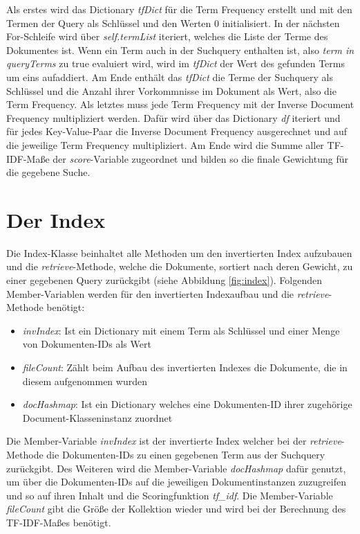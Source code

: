 Als erstes wird das Dictionary \textit{tfDict} für die Term Frequency erstellt und mit den Termen der Query als Schlüssel und den Werten 0 initialisiert. In der nächsten For-Schleife wird über \textit{self.termList} iteriert, welches die Liste der Terme des Dokumentes ist. Wenn ein Term auch in der Suchquery enthalten ist, also \textit{term in queryTerms} zu true evaluiert wird, wird im \textit{tfDict} der Wert des gefunden Terms um eins aufaddiert. Am Ende enthält das \textit{tfDict} die Terme der Suchquery als Schlüssel und die Anzahl ihrer Vorkommnisse im Dokument als Wert, also die Term Frequency. Als letztes muss jede Term Frequency mit der Inverse Document Frequency multipliziert werden. Dafür wird über das Dictionary \textit{df} iteriert und für jedes Key-Value-Paar die Inverse Document Frequency ausgerechnet und auf die jeweilige Term Frequency multipliziert. Am Ende wird die Summe aller TF-IDF-Maße der \textit{score}-Variable zugeordnet und bilden so die finale Gewichtung für die gegebene Suche.

\section{Der Index}\label{der-index}

Die Index-Klasse beinhaltet alle Methoden um den invertierten Index aufzubauen und die \textit{retrieve}-Methode, welche die Dokumente, sortiert nach deren Gewicht, zu einer gegebenen Query zurückgibt (siehe Abbildung \ref{fig:index}). Folgenden Member-Variablen werden für den invertierten Indexaufbau und die \textit{retrieve}-Methode benötigt:

\begin{itemize}
	\item \textit{invIndex}: Ist ein Dictionary mit einem Term als Schlüssel und einer Menge von Dokumenten-IDs als Wert
	\item \textit{fileCount}: Zählt beim Aufbau des invertierten Indexes die Dokumente, die in diesem aufgenommen wurden
	\item \textit{docHashmap}: Ist ein Dictionary welches eine Dokumenten-ID ihrer zugehörige Document-Klasseninstanz zuordnet
\end{itemize}

Die Member-Variable \textit{invIndex} ist der invertierte Index welcher bei der \textit{retrieve}-Methode die Dokumenten-IDs zu einen gegebenen Term aus der Suchquery zurückgibt. Des Weiteren wird die Member-Variable \textit{docHashmap} dafür genutzt, um über die Dokumenten-IDs auf die jeweiligen Dokumentinstanzen zuzugreifen und so auf ihren Inhalt und die Scoringfunktion \textit{tf\_idf}. Die Member-Variable \textit{fileCount} gibt die Größe der Kollektion wieder und wird bei der Berechnung des TF-IDF-Maßes benötigt.

